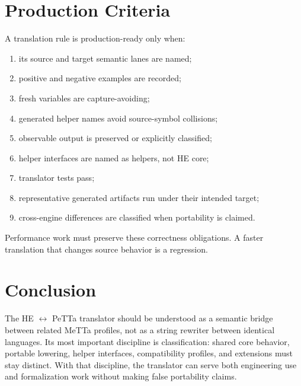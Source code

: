 \documentclass[11pt]{article}
\newcommand{\HE}{\textup{HE}}
\newcommand{\PeTTa}{\textup{PeTTa}}
\begin{document}
\section{Production Criteria}

A translation rule is production-ready only when:
\begin{enumerate}
\item its source and target semantic lanes are named;
\item positive and negative examples are recorded;
\item fresh variables are capture-avoiding;
\item generated helper names avoid source-symbol collisions;
\item observable output is preserved or explicitly classified;
\item helper interfaces are named as helpers, not \HE{} core;
\item translator tests pass;
\item representative generated artifacts run under their intended target;
\item cross-engine differences are classified when portability is claimed.
\end{enumerate}

Performance work must preserve these correctness obligations.  A faster
translation that changes source behavior is a regression.

\section{Conclusion}

The \HE{} $\leftrightarrow$ \PeTTa{} translator should be understood as a
semantic bridge between related MeTTa profiles, not as a string rewriter between
identical languages.  Its most important discipline is classification: shared
core behavior, portable lowering, helper interfaces, compatibility profiles, and
extensions must stay distinct.  With that discipline, the translator can serve
both engineering use and formalization work without making false portability
claims.
\end{document}

